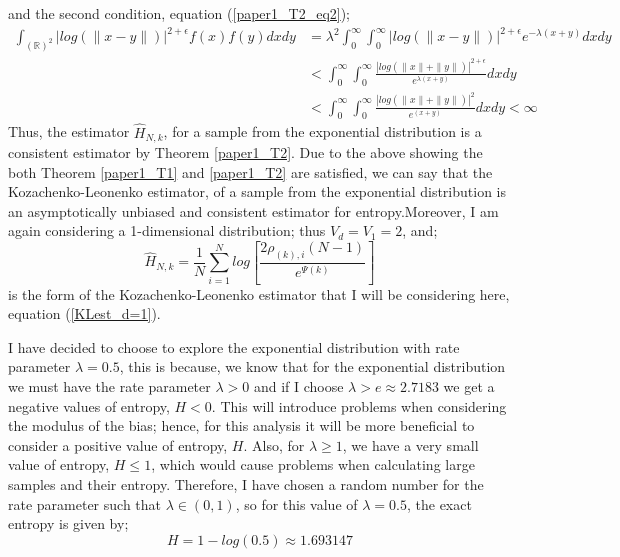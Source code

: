 \documentclass{article}
\begin{document}
and the second condition, equation (\ref{paper1_T2_eq2});
\begin{align} \nonumber
\int_{(\mathbb{R})^2} | log(\|x-y\|)|^{2+ \epsilon} f(x) f(y) dx dy  &= \lambda^2 \int_{0}^{\infty} \int_{0}^{\infty} | log(\|x-y\|)|^{2+ \epsilon} e^{- \lambda (x + y)} dx dy \\ \nonumber
&<  \int_{0}^{\infty} \int_{0}^{\infty}  \frac{| log(\|x\| + \|y\|)|^{2+ \epsilon}}{e^{\lambda (x + y)}} dx dy \\ \nonumber
&<  \int_{0}^{\infty} \int_{0}^{\infty}  \frac{| log(\|x\| + \|y\|)|^2}{e^{(x + y)}} dx dy < \infty  \nonumber
\end{align}
Thus, the estimator $\hat{H}_{N,k}$, for a sample from the exponential distribution is a consistent estimator by Theorem \ref{paper1_T2}. Due to the above showing the both Theorem \ref{paper1_T1} and \ref{paper1_T2} are satisfied, we can say that the Kozachenko-Leonenko estimator, of a sample from the exponential distribution is an asymptotically unbiased and consistent estimator for entropy.Moreover, I am again considering a 1-dimensional distribution; thus $V_{d} = V_{1} = 2$, and;
\begin{equation}
\hat{H}_{N, k} =  \frac{1}{N} \sum_{i=1}^{N} log \left[ \frac{2\rho_{(k),i}(N-1)}{e^{\Psi(k)}} \right]\nonumber
\end{equation}
is the form of the Kozachenko-Leonenko estimator that I will be considering here, equation (\ref{KLest_d=1}).

I have decided to choose to explore the exponential distribution with rate parameter $\lambda = 0.5$, this is because, we know that for the exponential distribution we must have the rate parameter $\lambda >0$ and if I choose $\lambda > e \approx 2.7183$ we get a negative values of entropy, $H < 0$. This will introduce problems when considering the modulus of the bias; hence, for this analysis it will be more beneficial to consider a positive value of entropy, $H$. Also, for $\lambda \geq 1$, we have a very small value of entropy, $H \leq 1$, which would cause problems when calculating large samples and their entropy. Therefore, I have chosen a random number for the rate parameter such that $\lambda \in (0, 1)$, so for this value of $\lambda=0.5$, the exact entropy is given by;
\begin{equation} \label{exponential_exact}
H = 1 - log(0.5) \approx 1.693147
\end{equation}
\end{document}
